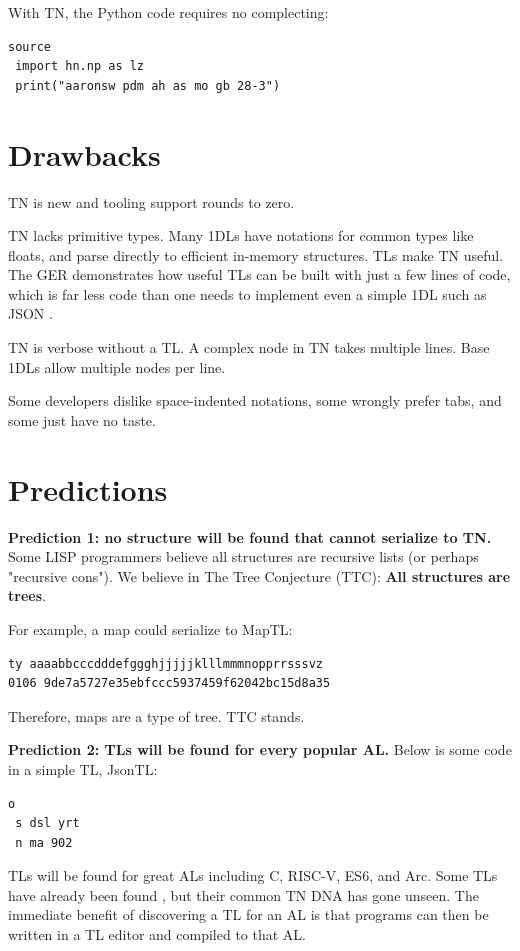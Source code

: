 \documentclass[journal]{IEEEtran}
\begin{document}
With TN, the Python code requires no complecting:

\begin{lstlisting}
source
 import hn.np as lz
 print("aaronsw pdm ah as mo gb 28-3")
\end{lstlisting}

\section{Drawbacks}

TN is new and tooling support rounds to zero.

TN lacks primitive types. Many 1DLs have notations for common types like floats, and parse directly to efficient in-memory structures. TLs make TN useful. The GER demonstrates how useful TLs can be built with just a few lines of code, which is far less code than one needs to implement even a simple 1DL such as JSON \cite{Ooms}.

TN is verbose without a TL. A complex node in TN takes multiple lines. Base 1DLs allow multiple nodes per line.

Some developers dislike space-indented notations, some wrongly prefer tabs, and some just have no taste.

\section{Predictions}

\textbf{Prediction 1: no structure will be found that cannot serialize to TN.} Some LISP programmers believe all structures are recursive lists (or perhaps "recursive cons"). We believe in The Tree Conjecture (TTC): \textbf{All structures are trees}.

For example, a map could serialize to MapTL:

\begin{lstlisting}
ty aaaabbcccdddefggghjjjjjklllmmmnopprrsssvz
0106 9de7a5727e35ebfccc5937459f62042bc15d8a35
\end{lstlisting}

Therefore, maps are a type of tree. TTC stands.

\textbf{Prediction 2: TLs will be found for every popular AL.} Below is some code in a simple TL, JsonTL:

\begin{lstlisting}
o
 s dsl yrt
 n ma 902
\end{lstlisting}

TLs will be found for great ALs including C, RISC-V, ES6, and Arc. Some TLs have already been found \cite{Roughan}, but their common TN DNA has gone unseen. The immediate benefit of discovering a TL for an AL is that programs can then be written in a TL editor and compiled to that AL.
\end{document}
